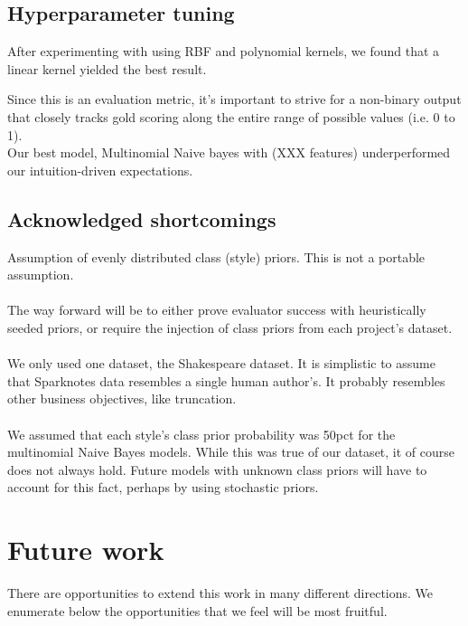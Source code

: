 \documentclass[letterpaper, 10 pt, conference]{ieeeconf}  %
\begin{document}
  \subsection{Hyperparameter tuning}
    After experimenting with using RBF and polynomial kernels, we found that a linear kernel yielded the best result.


    Since this is an evaluation metric, it's important to strive for a non-binary output that closely tracks gold scoring along the entire range of possible values (i.e. 0 to 1).\\
    Our best model, Multinomial Naive bayes with (XXX features) underperformed our intuition-driven expectations.


  \subsection{Acknowledged shortcomings}
  Assumption of evenly distributed class (style) priors. This is not a portable assumption. \\ \\The way forward will be to either prove evaluator success with heuristically seeded priors, or require the injection of class priors from each project's dataset. \\ \\
We only used one dataset, the Shakespeare dataset. It is simplistic to assume that Sparknotes data resembles a single human author's. It probably resembles other business objectives, like truncation.
\\
\\
  We assumed that each style's class prior probability was 50pct for the multinomial Naive Bayes models. While this was true of our dataset, it of course does not always hold. Future models with unknown class priors will have to account for this fact, perhaps by using stochastic priors.

\section{Future work}
There are opportunities to extend this work in many different directions. We enumerate below the opportunities that we feel will be most fruitful. \\
\end{document}
